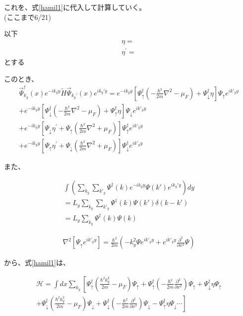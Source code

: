 \documentclass{jsarticle}
\begin{document}
		これを、式\eqref{hamil1}に代入して計算していく。　\\
		
		(ここまで6/21)

		以下
		\begin{align}
			\eta= \\
			\eta^{'}=
		\end{align}
		とする


		このとき、
		\begin{align}
			\vec{\Psi}_{k_y}^\dagger(x) e^{-ik_yy} \tilde{H}  \vec{\Psi}_{k_y'}(x) e^{ik_y'y} =
			e^{-ik_yy} \left[ \Psi_\uparrow^\dagger \left( -\frac{\hbar^2}{2m}\nabla^2-\mu_F \right) +\Psi_\downarrow^\dagger \eta \right] \Psi_\uparrow e^{ik'_yy} \nonumber\\
			+e^{-ik_yy} \left[ \Psi_\downarrow^\dagger \left( -\frac{\hbar^2}{2m}\nabla^2-\mu_F \right) +\Psi_\uparrow^\dagger \eta \right] \Psi_\downarrow e^{ik'_yy} \nonumber\\
			+ e^{-ik_yy} \left[ \Psi_\downarrow \eta^{'} +\Psi_\uparrow \left( \frac{\hbar^2}{2m}\nabla^2+\mu_F \right) \right] \Psi_\uparrow^\dagger e^{ik'_yy} \nonumber\\
			+e^{-ik_yy} \left[ \Psi_\uparrow \eta^{'} +\Psi_\downarrow \left( \frac{\hbar^2}{2m}\nabla^2+\mu_F \right) \right] \Psi_\downarrow^\dagger e^{ik'_yy}
		\end{align}

		また、

		\begin{align}
		\int \left( \sum_{k_y}\sum_{k'_y}\Psi^\dagger(k) e^{-ik_yy}\Psi(k')e^{ik_y'y} \right) dy \nonumber \\
		=L_y\sum_{k_y}\sum_{k'_y}\Psi^\dagger(k) \Psi(k')\delta \left( k-k' \right) \nonumber \\
		=L_y\sum_{k_y}\Psi^\dagger(k)\Psi(k)
		\end{align}

		\begin{align}
			\nabla^2 \left[ \Psi_\uparrow e^{ik'_yy} \right]=
			\frac{\hbar^2}{2m}
			\left( -k_y^2\Psi e^{ik'_yy} + e^{ik'_yy}\frac{\partial^2}{\partial x^2}\Psi \right)
		\end{align}


		から、式\eqref{hamil1}は、

		\begin{align}
			\mathcal{H}=\int dx \sum_{k_y}
			\left[ \Psi_\uparrow^\dagger \left( \frac{\hbar^2k_y^2}{2m}-\mu_F \right)\Psi_\uparrow
			+\Psi_\uparrow^\dagger \left(- \frac{\hbar^2}{2m}\frac{\partial^2}{\partial x^2}\right)\Psi_\uparrow
			+\Psi_\downarrow^\dagger \eta \Psi_\uparrow \right. \nonumber \\ \left.+
			\Psi_\downarrow^\dagger \left( \frac{\hbar^2k_y^2}{2m}-\mu_F \right)\Psi_\downarrow
			+\Psi_\downarrow^\dagger \left(- \frac{\hbar^2}{2m}\frac{\partial^2}{\partial x^2} \right) \Psi_\downarrow
			-\Psi_\uparrow^\dagger \eta \Psi_\downarrow \cdots
			\right]
			\label{hamil2}
		\end{align}
\end{document}
